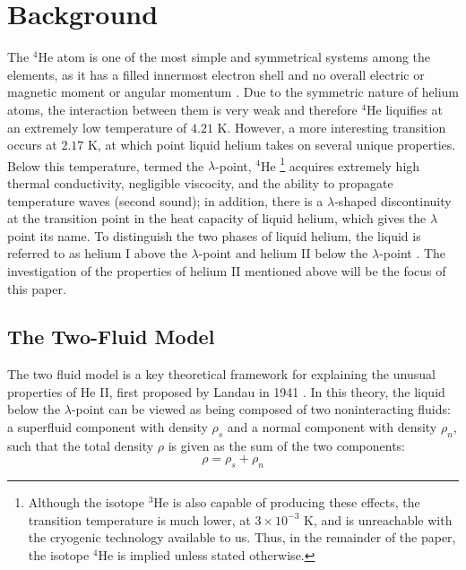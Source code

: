 
\section{Background}\label{background}

The $^4$He atom is one of the most simple and symmetrical systems
among the elements, as it has a filled innermost electron shell and no
overall electric or magnetic moment or angular momentum
\cite{atkins}. Due to the symmetric nature of helium atoms, the
interaction between them is very weak and therefore $^4$He liquifies
at an extremely low temperature of $4.21$ K. However, a more
interesting transition occurs at $2.17$ K, at which point liquid
helium takes on several unique properties. Below this temperature,
termed the $\lambda$-point, $^4$He \footnote{Although the isotope
  $^3$He is also capable of producing these effects, the transition
  temperature is much lower, at $3\times 10^{-3}$ K, and is
  unreachable with the cryogenic technology available to us. Thus, in
  the remainder of the paper, the isotope $^4$He is implied unless
  stated otherwise.}  acquires extremely high thermal conductivity,
negligible viscocity, and the ability to propagate temperature waves
(second sound); in addition, there is a $\lambda$-shaped discontinuity
at the transition point in the heat capacity of liquid helium, which
gives the $\lambda$ point its name. To distinguish the two phases of
liquid helium, the liquid is referred to as helium I above the
$\lambda$-point and helium II below the $\lambda$-point
\cite{tilley}. The investigation of the properties of helium II
mentioned above will be the focus of this paper.

\subsection{The Two-Fluid Model}\label{thetwofluidmodel}

The two fluid model is a key theoretical framework for explaining the
unusual properties of He II, first proposed by Landau in 1941
\cite{landau}. In this theory, the liquid below the $\lambda$-point
can be viewed as being composed of two noninteracting fluids: a
superfluid component with density $\rho_s$ and a normal component with
density $\rho_n$, such that the total density $\rho$ is given as the
sum of the two components:
\begin{equation}
\rho = \rho_s + \rho_n
\label{eqn:density}
\end{equation}

